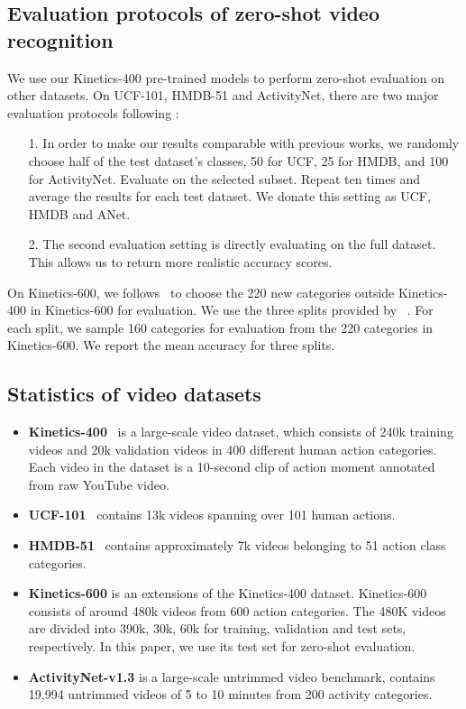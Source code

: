 \documentclass[letterpaper]{article} \usepackage{aaai23}  \usepackage{times}  \usepackage{helvet}  \usepackage{courier}  \usepackage[hyphens]{url}  \usepackage{graphicx} \urlstyle{rm} \def\UrlFont{\rm}  \usepackage{natbib}  \usepackage{caption} \frenchspacing  \setlength{\pdfpagewidth}{8.5in}  \setlength{\pdfpageheight}{11in}  \usepackage{algorithm}
\begin{document}
\subsection{Evaluation protocols of zero-shot video recognition}\label{sec:zero}
We use our Kinetics-400 pre-trained models to perform zero-shot evaluation on other datasets.
On UCF-101, HMDB-51 and ActivityNet, there are two major evaluation protocols following \cite{E2E}: 
\begin{itemize}
    \item[1.] In order to make our results comparable with previous works, we randomly choose half of the test dataset’s classes, 50 for UCF, 25 for HMDB, and 100 for ActivityNet. Evaluate on the selected subset. Repeat ten times and average the results for each test dataset. We donate this setting as UCF, HMDB and ANet.
    \item[2.] The second evaluation setting is directly evaluating on the full dataset. This allows us to return more realistic accuracy scores. 
\end{itemize}

On Kinetics-600, we follows~\cite{ER} to choose the 220 new categories outside Kinetics-400 in Kinetics-600 for evaluation. We use the three splits provided by ~\cite{ER}. For each split, we sample 160 categories for evaluation from the 220 categories in Kinetics-600. We report the mean accuracy for three splits.


\subsection{Statistics of video datasets}\label{sec:video_datasets}
\begin{itemize}
\item \textbf{Kinetics-400}~\cite{kay2017kinetics} is a large-scale video dataset, which consists of 240k training videos and 20k validation videos in 400 different human action categories. Each video in the dataset is a 10-second clip of action moment annotated from raw YouTube video.
\item \textbf{UCF-101}~\cite{ucf101} contains 13k videos spanning over 101 human actions.
\item \textbf{HMDB-51}~\cite{hmdb} contains approximately 7k videos belonging to 51 action class categories.
\item \textbf{Kinetics-600} is an extensions of the Kinetics-400 dataset. Kinetics-600 consists of around 480k videos from 600 action categories. The 480K videos are divided into 390k, 30k, 60k for training, validation and test sets, respectively. In this paper, we use its test set for zero-shot evaluation.
\item \textbf{ActivityNet-v1.3} is a large-scale untrimmed video benchmark, contains
19,994 untrimmed videos of 5 to 10 minutes from 200 activity categories.
\end{itemize}
\end{document}
